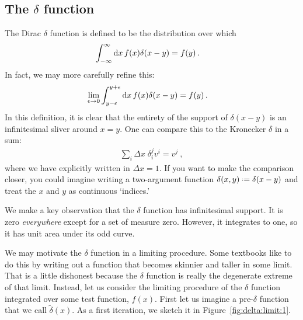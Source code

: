 \documentclass[12pt, oneside]{report}    %
\let\oldsection\section
\def\section{%
  \setcounter{sidenote}{1}%
  \oldsection
}
\begin{document}
\begin{subappendices}
\section{\texorpdfstring{The $\delta$ function}{The Delta Function}}

The Dirac $\delta$ function is defined to be the distribution over which
\begin{align}
    \int_{-\infty}^\infty \operatorname{d}\!{x}\, f(x)\delta(x-y) &= f(y) \, .
\end{align}
In fact, we may more carefully refine this:
\begin{align}
\lim_{\epsilon \to 0}
    \int_{y-\epsilon}^{y+\epsilon} \operatorname{d}\!{x}\, f(x)\delta(x-y) &= f(y) \, .
\end{align}
In this definition, it is clear that the entirety of the support of $\delta(x-y)$ is an infinitesimal sliver around $x=y$. One can compare this to the Kronecker $\delta$ in a sum:
\begin{align}
    \sum_i \Delta x\; \delta^j_i v^i = v^j \ ,
\end{align}
where we have explicitly written in $\Delta x = 1$. If you want to make the comparison closer, you could imagine writing a two-argument function $\delta(x,y)\defeq \delta(x-y)$ and treat the $x$ and $y$ as continuous `indices.'

We make a key observation that the $\delta$ function has infinitesimal support. It is zero \emph{everywhere} except for a set of measure zero. However, it integrates to one, so it has unit area under its odd curve.

We may motivate the $\delta$ function in a limiting procedure. Some textbooks like to do this by writing out a function that becomes skinnier and taller in some limit. That is a little dishonest because the $\delta$ function is really the degenerate extreme of that limit. Instead, let us consider the limiting procedure of the $\delta$ function integrated over some test function, $f(x)$. First let us imagine a pre-$\delta$ function that we call $\tilde \delta(x)$. As a first iteration, we sketch it in Figure~\ref{fig:delta:limit:1}.


\end{subappendices}
\end{document}
